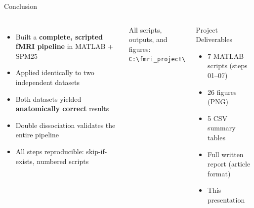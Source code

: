 \documentclass[aspectratio=169]{beamer}
\begin{document}
\begin{frame}{Conclusion}
  \begin{columns}
      \begin{itemize}
        \item Built a \textbf{complete, scripted fMRI pipeline} in MATLAB + SPM25
        \item Applied identically to two independent datasets
        \item Both datasets yielded \textbf{anatomically correct} results
        \item Double dissociation validates the entire pipeline
        \item All steps reproducible: skip-if-exists, numbered scripts
      \end{itemize}
      \vspace{0.5em}
      \small All scripts, outputs, and figures:\\
      \texttt{C:\textbackslash fmri\_project\textbackslash}
      \begin{block}{Project Deliverables}
        \begin{itemize}
          \item 7 MATLAB scripts (steps 01--07)
          \item 26 figures (PNG)
          \item 5 CSV summary tables
          \item Full written report (article format)
          \item This presentation
        \end{itemize}
      \end{block}
  \end{columns}
\end{frame}
\end{document}
